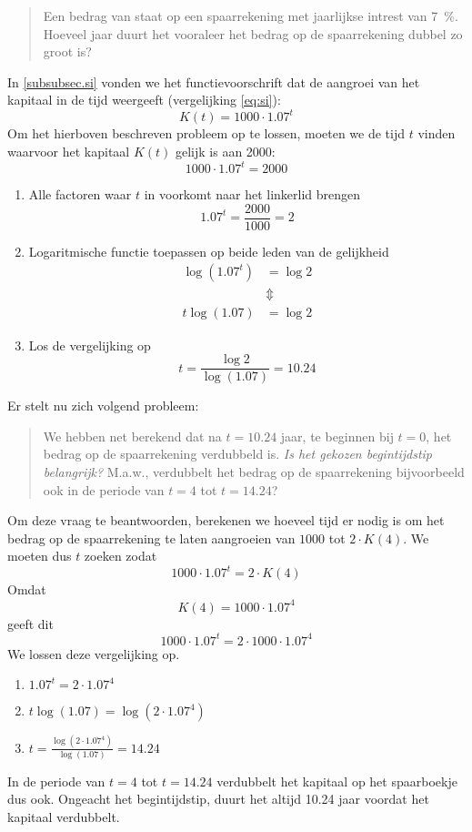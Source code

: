   \begin{quote}
 Een bedrag van  staat op een spaarrekening met jaarlijkse intrest van \SI{7}{\percent}. Hoeveel jaar duurt het vooraleer het bedrag op de spaarrekening dubbel zo groot is?
\end{quote}
In \cref{subsubsec.si} vonden we het functievoorschrift dat de aangroei van het
kapitaal in de tijd weergeeft (vergelijking \eqref{eq:si}):
 \begin{displaymath}
     K(t)=1000\cdot \num{1.07}^{t}
 \end{displaymath}
Om het hierboven beschreven probleem op te lossen, moeten we de tijd $t$ vinden waarvoor het kapitaal $K(t)$ gelijk is  aan 2000:
\[
1000\cdot \num{1.07}^{t}  =  2000 
\]
\begin{enumerate}
\item Alle factoren waar $t$ in voorkomt naar het linkerlid brengen
\[
\num{1.07}^{t}=\frac{2000}{1000}=2
\]
\addtocounter{enumi}{1}
\item Logaritmische functie toepassen op beide leden van de gelijkheid
\[
\begin{split}
\log \left(\num{1.07}^{t} \right)&=\log 2\\
&\Updownarrow \\
t\log \left(\num{1.07} \right)&=\log 2
\end{split}
\]
\item Los de vergelijking op
\[
t=\frac{\log 2}{\log \left(\num{1.07} \right)}=\num{10.24}
\]
\end{enumerate}

Er stelt nu zich volgend probleem:
 \begin{quote}
 We hebben net berekend dat na $t=\num{10.24}$ jaar, te beginnen bij $t=0$,  het bedrag op de spaarrekening verdubbeld is.\emph{ Is het gekozen begintijdstip belangrijk?} M.a.w., verdubbelt het bedrag op de spaarrekening bijvoorbeeld ook in de periode van $t=4$ tot $t=\num{14.24}$?
 \end{quote}
 Om deze vraag te beantwoorden, berekenen we hoeveel tijd er nodig is om het bedrag op de spaarrekening te laten aangroeien van $1000$ tot $2\cdot K(4)$. We moeten dus $t$ zoeken zodat 
 \[
1000\cdot \num{1.07}^t= 2\cdot K(4)
 \]
 Omdat 
 \[
 K(4)=1000\cdot \num{1.07}^4
 \]
 geeft dit
 \[
 1000\cdot \num{1.07}^t=2\cdot 1000\cdot \num{1.07}^4
 \]
 We lossen deze vergelijking op.
 \begin{enumerate}
 \item $\displaystyle 
     \num{1.07}^{t} =  2 \cdot \num{1.07}^{4} $
 \addtocounter{enumi}{1}
 \item $\displaystyle 
     t\log(\num{1.07}) =  \log\left(2\cdot \num{1.07}^{4}\right) $
 \item $\displaystyle 
     t =  \frac{\log\left(2\cdot \num{1.07}^{4}\right)}{\log(\num{1.07})}=\num{14.24}$
 \end{enumerate}
 In de periode van $t=4$ tot $t=\num{14.24}$ verdubbelt het kapitaal op het spaarboekje dus ook. Ongeacht het begintijdstip, duurt het altijd \num{10.24} jaar voordat het kapitaal verdubbelt.
 
